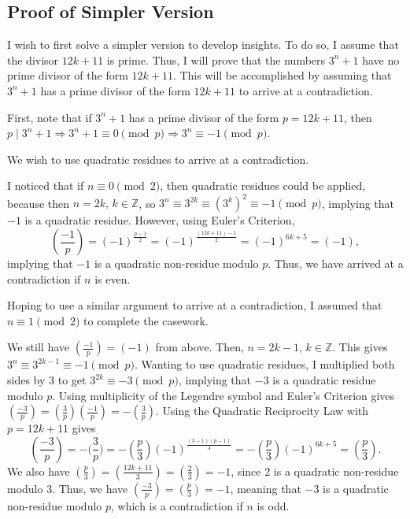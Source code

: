 \documentclass{article}
\newcommand{\Z}{\mathbb{Z}}
\newcommand{\qrn}[2]{\left( \frac{#1}{#2}\right)}
\begin{document}
\subsection{Proof of Simpler Version}
\label{proofsimpler}
I wish to first solve a simpler version to develop insights. To do so, I assume that the divisor $12k + 11$ is prime. Thus, I will prove that the numbers $3^n + 1$ have no prime divisor of the form $12k + 11$. This will be accomplished by assuming that $3^n + 1$ has a prime divisor of the form $12k+11$ to arrive at a contradiction.

First, note that if $3^n+1$ has a prime divisor of the form $p=12k+11$, then $p \mid 3^n + 1 \Rightarrow 3^n+1 \equiv 0 \pmod p \Rightarrow 3^n \equiv -1 \pmod p$.

We wish to use quadratic residues to arrive at a contradiction.

I noticed that if $n \equiv 0 \pmod 2$, then quadratic residues could be applied, because then $n=2k, \hspace{2pt} k \in \Z$, so $3^n \equiv 3^{2k} \equiv (3^{k})^2 \equiv -1 \pmod p$, implying that $-1$ is a quadratic residue. However, using Euler's Criterion, \[\left(\frac{-1}{p}\right)=(-1)^{\frac{p-1}{2}}=(-1)^{\frac{(12k+11)-1}{2}}=(-1)^{6k+5}=(-1),\] implying that $-1$ is a quadratic non-residue modulo $p$. Thus, we have arrived at a contradiction if $n$ is even.

Hoping to use a similar argument to arrive at a contradiction, I assumed that $n \equiv 1 \pmod 2$ to complete the casework.

We still have $\qrn{-1}{p}=(-1)$ from above. Then, $n=2k-1, \hspace{2pt} k\in \Z$. This gives $3^{n} \equiv 3^{2k-1} \equiv -1 \pmod p$. Wanting to use quadratic residues, I multiplied both sides by $3$ to get $3^{2k} \equiv -3 \pmod p$, implying that $-3$ is a quadratic residue modulo $p$. Using multiplicity of the Legendre symbol and Euler's Criterion gives $\left(\frac{-3}{p}\right)= \left(\frac{3}{p}\right)\left(\frac{-1}{p}\right)=-\qrn{3}{p}$. Using the Quadratic Reciprocity Law with $p=12k+11$ gives \[\qrn{-3}{p}=-\Big(\frac{3}{p}\Big)=-\qrn{p}{3}(-1)^{\frac{(3-1)(p-1)}{4}}=-\qrn{p}{3}(-1)^{6k+5}=\qrn{p}{3}.\] We also have $\left(\frac{p}{3}\right) = \left(\frac{12k+11}{3}\right) = \left(\frac{2}{3}\right)=-1$, since $2$ is a quadratic non-residue modulo $3$. Thus, we have $\qrn{-3}{p}= \qrn{p}{3}=-1$, meaning that $-3$ is a quadratic non-residue modulo $p$, which is a contradiction if $n$ is odd.
\end{document}
